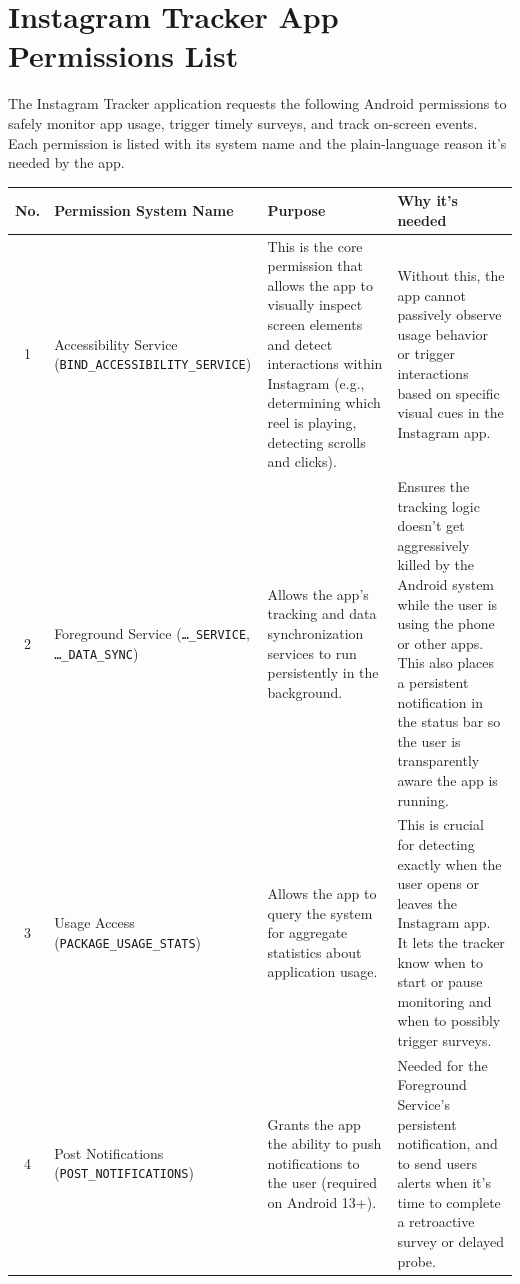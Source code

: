 \documentclass{article}
\begin{document}
\section*{Instagram Tracker App Permissions List}

The Instagram Tracker application requests the following Android permissions to safely monitor app usage, trigger timely surveys, and track on-screen events. Each permission is listed with its system name and the plain-language reason it's needed by the app.

\vspace{1em}

\noindent
\begin{tabularx}{\textwidth}{|c|>{\raggedright\arraybackslash}p{3.5cm}|>{\raggedright\arraybackslash}X|>{\raggedright\arraybackslash}X|}
\hline
\textbf{No.} & \textbf{Permission System Name} & \textbf{Purpose} & \textbf{Why it's needed} \\
\hline
1 & Accessibility Service (\texttt{BIND\_}\allowbreak\texttt{ACCESSIBILITY\_}\allowbreak\texttt{SERVICE}) & This is the core permission that allows the app to visually inspect screen elements and detect interactions within Instagram (e.g., determining which reel is playing, detecting scrolls and clicks). & Without this, the app cannot passively observe usage behavior or trigger interactions based on specific visual cues in the Instagram app. \\
\hline
2 & Foreground Service (\texttt{\dots\_}\allowbreak\texttt{SERVICE}, \texttt{\dots\_}\allowbreak\texttt{DATA\_}\allowbreak\texttt{SYNC}) & Allows the app's tracking and data synchronization services to run persistently in the background. & Ensures the tracking logic doesn't get aggressively killed by the Android system while the user is using the phone or other apps. This also places a persistent notification in the status bar so the user is transparently aware the app is running. \\
\hline
3 & Usage Access (\texttt{PACKAGE\_}\allowbreak\texttt{USAGE\_}\allowbreak\texttt{STATS}) & Allows the app to query the system for aggregate statistics about application usage. & This is crucial for detecting exactly when the user opens or leaves the Instagram app. It lets the tracker know when to start or pause monitoring and when to possibly trigger surveys. \\
\hline
4 & Post Notifications (\texttt{POST\_}\allowbreak\texttt{NOTIFICATIONS}) & Grants the app the ability to push notifications to the user (required on Android 13+). & Needed for the Foreground Service's persistent notification, and to send users alerts when it's time to complete a retroactive survey or delayed probe. \\

\end{tabularx}
\end{document}
